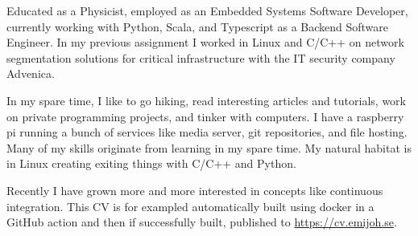 

Educated as a Physicist, employed as an Embedded Systems Software Developer,
currently working with Python, Scala, and Typescript as a Backend Software
Engineer. In my previous assignment I worked in Linux and C/C++ on network
segmentation solutions for critical infrastructure with the IT security
company Advenica.

In my spare time, I like to go hiking, read interesting articles and
tutorials, work on private programming projects, and tinker with computers. I
have a raspberry pi running a bunch of services like media server, git
repositories, and file hosting. Many of my skills originate from learning in
my spare time. My natural habitat is in Linux creating exiting things with
C/C++ and Python.

Recently I have grown more and more interested in concepts like continuous
integration. This CV is for exampled automatically built using docker in a
GitHub action and then if successfully built, published
to \url{https://cv.emijoh.se}.

